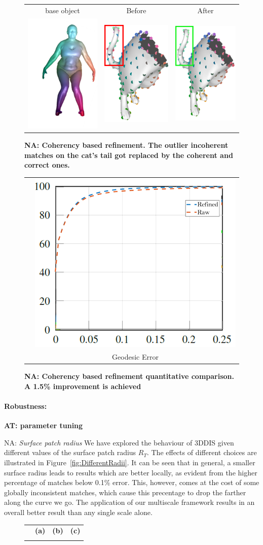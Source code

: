 \documentclass[10pt,twocolumn,letterpaper]{article}
\newcommand{\colornote}[3]{{\color{#1}\bf{#2: #3}\normalfont}}
\newcommand{\colornote}[3]{}
\newcommand {\ayellet}[1]{\colornote{blue}{AT}{#1}}
\newcommand {\nadav}[1]{\colornote{red}{NA}{#1}}
\begin{document}
\begin{figure}[htb]
	\centering
	\begin{tabular}{ccc}
		base object & Before & After  
		\\
		\includegraphics[scale=0.7]{figures/FailCutsbase.png} & \includegraphics[scale=0.4]{figures/cat_7_non_greedy.png} & \includegraphics[scale=0.4]{figures/cat_7_greedy.png} \\ 
	\end{tabular}
	
	\caption{\nadav{{\bf Coherency based refinement.} 
		The outlier incoherent matches on the cat's tail got replaced by the coherent and correct ones.}}
	\label{fig:CoherencyQual}
\end{figure}

\begin{figure}[htb]
	\centering
	\setlength\tabcolsep{0.5pt}
	\begin{tabular}{cc}
		\rotatebox{90}{    \, \% Correspondences} &
		\includegraphics[scale=0.4]{figures/CoherencyRefinement.png}\\
		& Geodesic Error \\
	\end{tabular}
	\caption{\nadav{{\bf Coherency based refinement} quantitative comparison. A 1.5\% improvement is achieved}}
	\label{fig:CoherencyQuant}
\end{figure}


\paragraph{Robustness:} 
\ayellet{parameter tuning}
\nadav{
\textit{Surface patch radius} We have explored the behaviour of 3DDIS given different values of the surface patch radius $R_T$. 
The effects of different choices are illustrated in Figure~\ref{fig:DifferentRadii}.
It can be seen that in general, a smaller surface radius leads to results which are better locally, as evident from the higher percentage of matches below 0.1\% error. 
This, however, comes at the cost of some globally inconsistent matches, which cause this precentage to drop the farther along the curve we go.
The application of our multiscale framework results in an overall better result than any single scale alone.
\begin{figure}[htb]

	\centering
	\setlength\tabcolsep{0.5pt}
	\begin{tabular}{cccc}
		& \textbf{(a)} & \textbf{(b)} & \textbf{(c)}\\
		\rotateb
\end{tabular}
\end{figure}}
\end{document}
